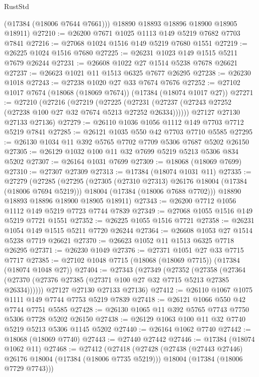 \begin{lexlean}{RustStd}
\begin{coremodule}
        (@17384 (@18006 @7644 @7661)))
      @18890
      @18893
      @18896
      @18900
      @18905
      @18911)
@27210 := @26200 @7671 @1025 @1113 @149 @5219 @7682 @7703 @7841
@27216 := @27068 @1024 @1516 @149 @5219 @7680 @1551
@27219 := @26225 @1024 @1516 @7680
@27225 := @26231 @1023 @149 @1515 @5211 @7679 @26244
@27231 := @26608 @1022 @27 @1514 @5238 @7678 @26621
@27237 := @26623 @1021 @11 @1513 @6325 @7677 @26295
@27238 := @26230 @1018
@27243 := @27238 @1020 @27 @33 @7674 @7676
@27252 := @27102 @1017 @7674 (@18068 (@18069 @7674)) (@17384 (@18074 @1017 @27))
@27271 := @27210
    (@27216
      (@27219
        (@27225 (@27231 (@27237 (@27243 @27252 (@27238 @100 @27 @32 @7674 @5213 @27252 @26334))))))
      @27127
      @27130
      @27133
      @27136)
@27279 := @26110 @1036 @1056 @1112 @149 @7703 @7712 @5219 @7841
@27285 := @26121 @1035 @550 @42 @7703 @7710 @5585
@27295 := @26130 @1034 @11 @392 @5765 @7702 @7709 @5306 @7687 @5202 @26150
@27305 := @26129 @1032 @100 @11 @32 @7699 @5219 @5213 @5306 @834 @5202
@27307 := @26164 @1031 @7699
@27309 := @18068 (@18069 @7699)
@27310 := @27307 @27309
@27313 := @17384 (@18074 @1031 @11)
@27335 := @27279
    (@27285
      (@27295
        (@27305 (@27310 @27313) @26176 @18004 (@17384 (@18006 @7694 @5219)))
        @18004
        (@17384 (@18006 @7688 @7702)))
      @18890
      @18893
      @18896
      @18900
      @18905
      @18911)
@27343 := @26200 @7712 @1056 @1112 @149 @5219 @7723 @7744 @7839
@27349 := @27068 @1055 @1516 @149 @5219 @7721 @1551
@27352 := @26225 @1055 @1516 @7721
@27358 := @26231 @1054 @149 @1515 @5211 @7720 @26244
@27364 := @26608 @1053 @27 @1514 @5238 @7719 @26621
@27370 := @26623 @1052 @11 @1513 @6325 @7718 @26295
@27371 := @26230 @1049
@27376 := @27371 @1051 @27 @33 @7715 @7717
@27385 := @27102 @1048 @7715 (@18068 (@18069 @7715)) (@17384 (@18074 @1048 @27))
@27404 := @27343
    (@27349
      (@27352
        (@27358 (@27364 (@27370 (@27376 @27385 (@27371 @100 @27 @32 @7715 @5213 @27385 @26334))))))
      @27127
      @27130
      @27133
      @27136)
@27412 := @26110 @1067 @1075 @1111 @149 @7744 @7753 @5219 @7839
@27418 := @26121 @1066 @550 @42 @7744 @7751 @5585
@27428 := @26130 @1065 @11 @392 @5765 @7743 @7750 @5306 @7728 @5202 @26150
@27438 := @26129 @1063 @100 @11 @32 @7740 @5219 @5213 @5306 @1145 @5202
@27440 := @26164 @1062 @7740
@27442 := @18068 (@18069 @7740)
@27443 := @27440 @27442
@27446 := @17384 (@18074 @1062 @11)
@27468 := @27412
    (@27418
      (@27428
        (@27438 (@27443 @27446) @26176 @18004 (@17384 (@18006 @7735 @5219)))
        @18004
        (@17384 (@18006 @7729 @7743)))

\end{coremodule}
\end{lexlean}
